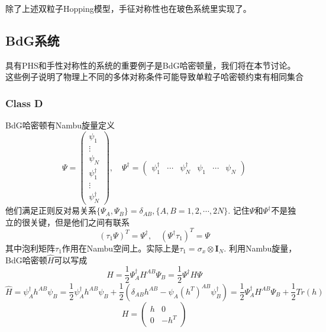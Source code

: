 \documentclass[a4paper]{article}
\numberwithin{equation}{subsection}
\begin{document}
除了上述双粒子Hopping模型，手征对称性也在玻色系统里实现了。

\subsection{BdG系统}
具有PHS和手性对称性的系统的重要例子是BdG哈密顿量，我们将在本节讨论。这些例子说明了物理上不同的多体对称条件可能导致单粒子哈密顿约束有相同集合
\subsubsection{Class D}
BdG哈密顿有Nambu旋量定义
\begin{equation}
    \Psi=\begin{pmatrix}
        \psi_1\\
        \vdots\\
        \psi_N\\
        \psi_1^\dagger\\
        \vdots\\
        \psi_N^\dagger
    \end{pmatrix},\quad
        \Psi^\dagger=\begin{pmatrix}
            \psi_1^\dagger&\cdots&\psi_N^\dagger&\psi_1&\cdots&\psi_N
        \end{pmatrix}
\end{equation}
他们满足正则反对易关系$\{\Psi_A,\Psi_B\}=\delta_{AB},\{A,B=1,2,\cdots,2N\}$. 记住$\Psi$和$\Psi^\dagger$不是独立的很关键，但是他们之间有联系
\begin{equation}\label{BdG relation}
    (\tau_1\Psi)^T=\Psi^\dagger,\quad (\Psi^\dagger\tau_1)^T=\Psi
\end{equation}
其中泡利矩阵$\tau_1$作用在Nambu空间上。实际上是$\tau_1=\sigma_x\otimes \mathbf{I}_N$. 利用Nambu旋量，BdG哈密顿$\hat{H}$可以写成
\begin{equation}
    \hat{H}=\frac{1}{2}\Psi_A^\dagger H^{AB}\Psi_B=\frac{1}{2}\Psi^\dagger H\Psi
\end{equation}
\begin{equation}
    \hat{H}=\psi_A^\dagger h^{AB}\psi_B=\frac{1}{2}\psi_A^\dagger h^{AB}\psi_B+\frac{1}{2}(\delta_{AB}h^{AB}-\psi_A (h^T)^{AB}\psi_B^\dagger)=\frac{1}{2}\Psi_A^\dagger H^{AB}\Psi_{B}+\frac{1}{2}Tr(h)
\end{equation}
\begin{equation}
    H=\begin{pmatrix}
        h&0\\
        0&-h^T
    \end{pmatrix}
\end{equation}
\end{document}
